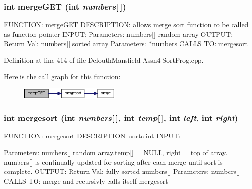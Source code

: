 \hypertarget{_delouth_mansfield-_assn4-_sort_prog_8cpp_a5bf887ba10188a54f08008fba4edd364}{
\subsubsection[{mergeGET}]{\setlength{\rightskip}{0pt plus 5cm}int mergeGET (int {\em numbers}\mbox{[}$\,$\mbox{]})}}
\label{_delouth_mansfield-_assn4-_sort_prog_8cpp_a5bf887ba10188a54f08008fba4edd364}
FUNCTION: mergeGET DESCRIPTION: allows merge sort function to be called as function pointer INPUT: Parameters: numbers\mbox{[}\mbox{]} random array OUTPUT: Return Val: numbers\mbox{[}\mbox{]} sorted array Parameters: $\ast$numbers CALLS TO: mergesort 

Definition at line 414 of file DelouthMansfield-\/Assn4-\/SortProg.cpp.



Here is the call graph for this function:\nopagebreak
\begin{figure}[H]
\begin{center}
\leavevmode
\includegraphics[width=142pt]{_delouth_mansfield-_assn4-_sort_prog_8cpp_a5bf887ba10188a54f08008fba4edd364_cgraph}
\end{center}
\end{figure}


\hypertarget{_delouth_mansfield-_assn4-_sort_prog_8cpp_a5f5d9f539f726c766f4c454c579f2f6d}{
\subsubsection[{mergesort}]{\setlength{\rightskip}{0pt plus 5cm}int mergesort (int {\em numbers}\mbox{[}$\,$\mbox{]}, \/  int {\em temp}\mbox{[}$\,$\mbox{]}, \/  int {\em left}, \/  int {\em right})}}
\label{_delouth_mansfield-_assn4-_sort_prog_8cpp_a5f5d9f539f726c766f4c454c579f2f6d}
FUNCTION: mergesort DESCRIPTION: sorts int INPUT:

Parameters: numbers\mbox{[}\mbox{]} random array,temp\mbox{[}\mbox{]} = NULL, right = top of array. numbers\mbox{[}\mbox{]} is continually updated for sorting after each merge until sort is complete. OUTPUT: Return Val: fully sorted numbers\mbox{[}\mbox{]} Parameters: numbers\mbox{[}\mbox{]} CALLS TO: merge and recursivly calls itself mergesort 

